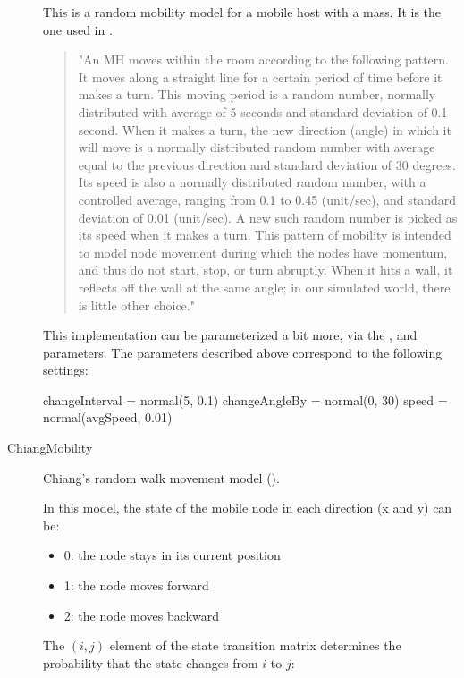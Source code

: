 \begin{description}
This is a random mobility model for a mobile host with
a mass. It is the one used in \cite{Perkins99optimizedsmooth}.

\begin{quote}
"An MH moves within the room according to the following pattern. It moves
along a straight line for a certain period of time before it makes a turn.
This moving period is a random number, normally distributed with average of
5 seconds and standard deviation of 0.1 second. When it makes a turn, the
new direction (angle) in which it will move is a normally distributed
random number with average equal to the previous direction and standard
deviation of 30 degrees. Its speed is also a normally distributed random
number, with a controlled average, ranging from 0.1 to 0.45 (unit/sec), and
standard deviation of 0.01 (unit/sec). A new such random number is picked
as its speed when it makes a turn. This pattern of mobility is intended to
model node movement during which the nodes have momentum, and thus do not
start, stop, or turn abruptly. When it hits a wall, it reflects off the
wall at the same angle; in our simulated world, there is little other
choice."
\end{quote}

This implementation can be parameterized a bit more, via the
,  and  parameters.
The parameters described above correspond to the following settings:

\begin{inifile}
changeInterval = normal(5, 0.1)
changeAngleBy = normal(0, 30)
speed = normal(avgSpeed, 0.01)
\end{inifile}

\item[ChiangMobility] Chiang's random walk movement model
(\cite{Chiang98wirelessnetwork}).

In this model, the state of the mobile node in each direction (x and y) can be:

\begin{itemize}
  \item 0: the node stays in its current position
  \item 1: the node moves forward
  \item 2: the node moves backward
\end{itemize}

The $(i,j)$ element of the state transition matrix determines the
probability that the state changes from $i$ to $j$:


\end{description}
